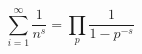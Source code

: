 \documentclass{article}
\begin{document}
\[ \sum_{i=1}^{\infty} \frac{1}{n^s} = \prod_p \frac{1}{1 - p^{-s}} \]
\end{document}
